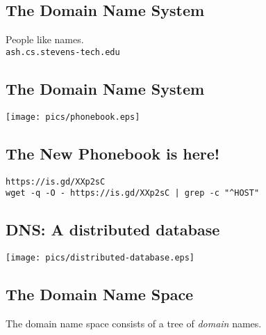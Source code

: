 \documentclass[xga]{xdvislides}
\begin{document}
\subsection{The Domain Name System}
\vspace{.5in}
\begin{center}
	\Huge
	People like names. \\
\vspace{.5in}
\verb+ash.cs.stevens-tech.edu+
\end{center}
\Normalsize


\subsection{The Domain Name System}
\vspace*{\fill}
\begin{center}
	\texttt{[image: pics/phonebook.eps]}
\end{center}
\vspace*{\fill}

\subsection{The New Phonebook is here!}
\vspace*{\fill}
\begin{center}
	\verb+https://is.gd/XXp2sC+ \\
	\addvspace{.5in}
	\verb+wget -q -O - https://is.gd/XXp2sC | grep -c "^HOST"+
\end{center}
\vspace*{\fill}

\subsection{DNS: A distributed database}
\vspace*{\fill}
\begin{center}
	\texttt{[image: pics/distributed-database.eps]}
\end{center}
\vspace*{\fill}

\subsection{The Domain Name Space}
\vspace{.5in}
\begin{center}
	\Huge
	The domain name space consists of a tree of {\em domain} names.
\end{center}
\Normalsize
\end{document}
